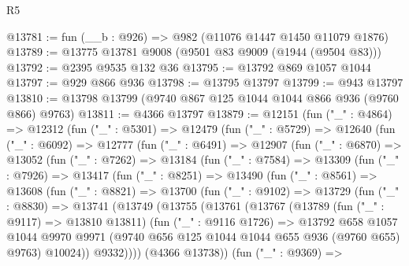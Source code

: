 \begin{lexlean}{R5}
\begin{coremodule}
@13781 := fun (__b : @926) => @982 (@11076 @1447 @1450 @11079 @1876)
@13789 := @13775 @13781 @9008 (@9501 @83 @9009 (@1944 (@9504 @83)))
@13792 := @2395 @9535 @132 @36
@13795 := @13792 @869 @1057 @1044
@13797 := @929 @866 @936
@13798 := @13795 @13797
@13799 := @943 @13797
@13810 := @13798 @13799 (@9740 @867 @125 @1044 @1044 @866 @936 (@9760 @866) @9763)
@13811 := @4366 @13797
@13879 := @12151
    (fun ("_" : @4864) =>
    @12312
      (fun ("_" : @5301) =>
      @12479
        (fun ("_" : @5729) =>
        @12640
          (fun ("_" : @6092) =>
          @12777
            (fun ("_" : @6491) =>
            @12907
              (fun ("_" : @6870) =>
              @13052
                (fun ("_" : @7262) =>
                @13184
                  (fun ("_" : @7584) =>
                  @13309
                    (fun ("_" : @7926) =>
                    @13417
                      (fun ("_" : @8251) =>
                      @13490
                        (fun ("_" : @8561) =>
                        @13608
                          (fun ("_" : @8821) =>
                          @13700
                            (fun ("_" : @9102) =>
                            @13729
                              (fun ("_" : @8830) =>
                              @13741
                                (@13749
                                  (@13755
                                    (@13761
                                      (@13767
                                        (@13789
                                          (fun ("_" : @9117) => @13810 @13811)
                                          (fun ("_" : @9116 @1726) =>
                                          @13792
                                            @658
                                            @1057
                                            @1044
                                            @9970
                                            @9971
                                            (@9740
                                              @656
                                              @125
                                              @1044
                                              @1044
                                              @655
                                              @936
                                              (@9760 @655)
                                              @9763)
                                            @10024))
                                        @9332))))
                                (@4366 @13738))
                              (fun ("_" : @9369) =>

\end{coremodule}
\end{lexlean}
